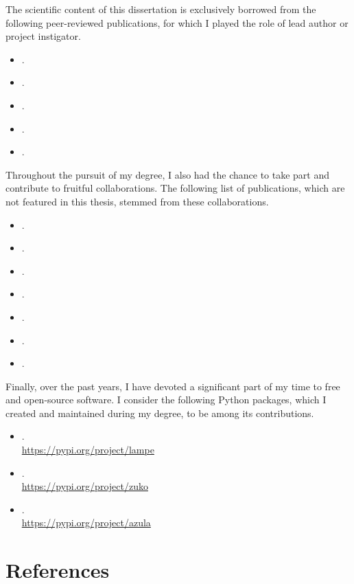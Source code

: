 The scientific content of this dissertation is exclusively borrowed from the following peer-reviewed publications, for which I played the role of lead author or project instigator.

\begin{itemize}[leftmargin=1em]
    \item[] .
    \item[] .
    \item[] .
    \item[] .
    \item[] .
\end{itemize}

Throughout the pursuit of my degree, I also had the chance to take part and contribute to fruitful collaborations. The following list of publications, which are not featured in this thesis, stemmed from these collaborations.

\begin{itemize}[leftmargin=1em]
    \item[] .
    \item[] .
    \item[] .
    \item[] .
    \item[] .
    \item[] .
    \item[] .
\end{itemize}

Finally, over the past years, I have devoted a significant part of my time to free and open-source software. I consider the following Python packages, which I created and maintained during my degree, to be among its contributions.

\begin{itemize}[leftmargin=1em]
    \item[] .\\ \url{https://pypi.org/project/lampe}
    \item[] .\\ \url{https://pypi.org/project/zuko}
    \item[] .\\ \url{https://pypi.org/project/azula}
\end{itemize}

\clearpage
\section*{References}

\printbibliography[heading=none]

